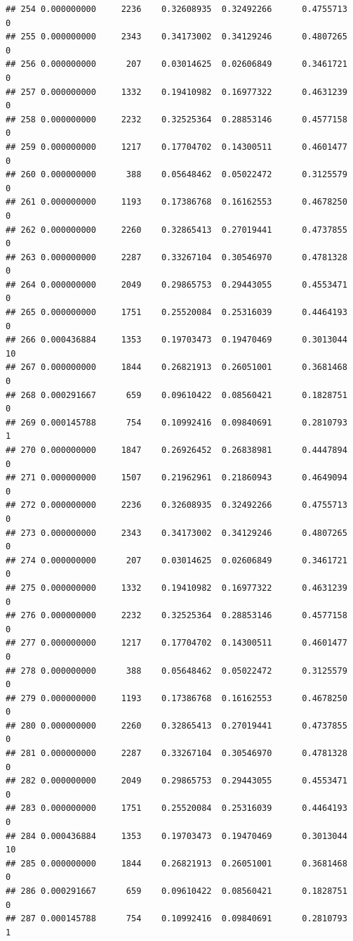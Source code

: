 \documentclass[
]{article}
\begin{document}
\begin{verbatim}
## 254 0.000000000     2236    0.32608935  0.32492266      0.4755713       0
## 255 0.000000000     2343    0.34173002  0.34129246      0.4807265       0
## 256 0.000000000      207    0.03014625  0.02606849      0.3461721       0
## 257 0.000000000     1332    0.19410982  0.16977322      0.4631239       0
## 258 0.000000000     2232    0.32525364  0.28853146      0.4577158       0
## 259 0.000000000     1217    0.17704702  0.14300511      0.4601477       0
## 260 0.000000000      388    0.05648462  0.05022472      0.3125579       0
## 261 0.000000000     1193    0.17386768  0.16162553      0.4678250       0
## 262 0.000000000     2260    0.32865413  0.27019441      0.4737855       0
## 263 0.000000000     2287    0.33267104  0.30546970      0.4781328       0
## 264 0.000000000     2049    0.29865753  0.29443055      0.4553471       0
## 265 0.000000000     1751    0.25520084  0.25316039      0.4464193       0
## 266 0.000436884     1353    0.19703473  0.19470469      0.3013044      10
## 267 0.000000000     1844    0.26821913  0.26051001      0.3681468       0
## 268 0.000291667      659    0.09610422  0.08560421      0.1828751       0
## 269 0.000145788      754    0.10992416  0.09840691      0.2810793       1
## 270 0.000000000     1847    0.26926452  0.26838981      0.4447894       0
## 271 0.000000000     1507    0.21962961  0.21860943      0.4649094       0
## 272 0.000000000     2236    0.32608935  0.32492266      0.4755713       0
## 273 0.000000000     2343    0.34173002  0.34129246      0.4807265       0
## 274 0.000000000      207    0.03014625  0.02606849      0.3461721       0
## 275 0.000000000     1332    0.19410982  0.16977322      0.4631239       0
## 276 0.000000000     2232    0.32525364  0.28853146      0.4577158       0
## 277 0.000000000     1217    0.17704702  0.14300511      0.4601477       0
## 278 0.000000000      388    0.05648462  0.05022472      0.3125579       0
## 279 0.000000000     1193    0.17386768  0.16162553      0.4678250       0
## 280 0.000000000     2260    0.32865413  0.27019441      0.4737855       0
## 281 0.000000000     2287    0.33267104  0.30546970      0.4781328       0
## 282 0.000000000     2049    0.29865753  0.29443055      0.4553471       0
## 283 0.000000000     1751    0.25520084  0.25316039      0.4464193       0
## 284 0.000436884     1353    0.19703473  0.19470469      0.3013044      10
## 285 0.000000000     1844    0.26821913  0.26051001      0.3681468       0
## 286 0.000291667      659    0.09610422  0.08560421      0.1828751       0
## 287 0.000145788      754    0.10992416  0.09840691      0.2810793       1

\end{verbatim}
\end{document}
